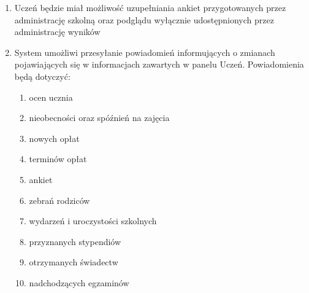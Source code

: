 \documentclass{article}
\begin{document}
\begin{enumerate}
	\item Uczeń będzie miał możliwość uzupełniania ankiet przygotowanych przez administrację szkolną oraz podglądu wyłącznie udostępnionych przez administrację wyników
	\item System umożliwi przesyłanie powiadomień informujących o zmianach pojawiających się w informacjach zawartych w panelu Uczeń. Powiadomienia będą dotyczyć:
	\begin{enumerate}
		\item ocen ucznia
		\item nieobecności oraz spóźnień na zajęcia
		\item nowych opłat
		\item terminów opłat 
		\item ankiet
		\item zebrań rodziców
		\item wydarzeń i uroczystości szkolnych
		\item przyznanych stypendiów
		\item otrzymanych świadectw
		\item nadchodzących egzaminów
	\end{enumerate}	
\end{enumerate}
\end{document}
